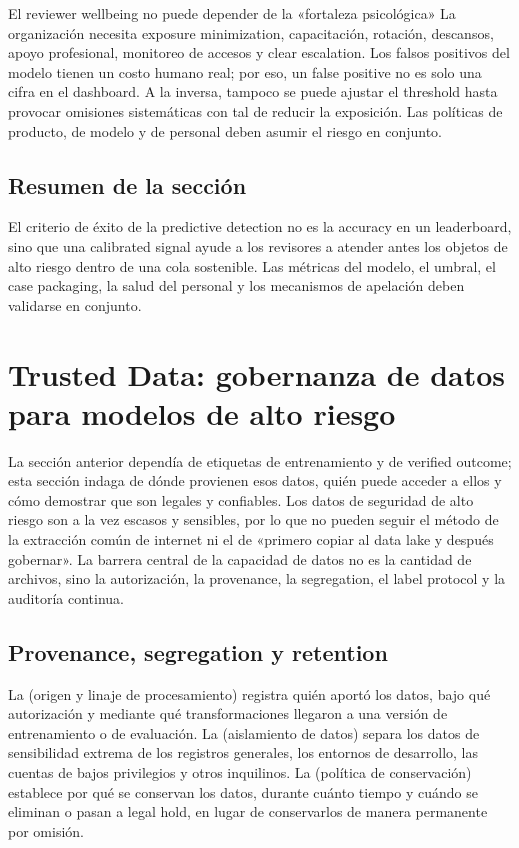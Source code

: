 \documentclass[a4paper]{article}
\begin{document}
\begin{warningbox}{El reviewer wellbeing no puede depender de la «fortaleza psicológica»}
La organización necesita exposure minimization, capacitación, rotación, descansos, apoyo profesional, monitoreo de accesos y clear escalation. Los falsos positivos del modelo tienen un costo humano real; por eso, un false positive no es solo una cifra en el dashboard. A la inversa, tampoco se puede ajustar el threshold hasta provocar omisiones sistemáticas con tal de reducir la exposición. Las políticas de producto, de modelo y de personal deben asumir el riesgo en conjunto.
\end{warningbox}

\subsection{Resumen de la sección}

El criterio de éxito de la predictive detection no es la accuracy en un leaderboard, sino que una calibrated signal ayude a los revisores a atender antes los objetos de alto riesgo dentro de una cola sostenible. Las métricas del modelo, el umbral, el case packaging, la salud del personal y los mecanismos de apelación deben validarse en conjunto.
\section{Trusted Data: gobernanza de datos para modelos de alto riesgo}

La sección anterior dependía de etiquetas de entrenamiento y de verified outcome; esta sección indaga de dónde provienen esos datos, quién puede acceder a ellos y cómo demostrar que son legales y confiables. Los datos de seguridad de alto riesgo son a la vez escasos y sensibles, por lo que no pueden seguir el método de la extracción común de internet ni el de «primero copiar al data lake y después gobernar». La barrera central de la capacidad de datos no es la cantidad de archivos, sino la autorización, la provenance, la segregation, el label protocol y la auditoría continua.

\subsection{Provenance, segregation y retention}

La  (origen y linaje de procesamiento) registra quién aportó los datos, bajo qué autorización y mediante qué transformaciones llegaron a una versión de entrenamiento o de evaluación. La  (aislamiento de datos) separa los datos de sensibilidad extrema de los registros generales, los entornos de desarrollo, las cuentas de bajos privilegios y otros inquilinos. La  (política de conservación) establece por qué se conservan los datos, durante cuánto tiempo y cuándo se eliminan o pasan a legal hold, en lugar de conservarlos de manera permanente por omisión.
\end{document}
